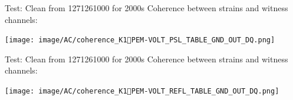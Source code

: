 \documentclass[xcolor=dvipsnames]{beamer}
\begin{document}
\begin{frame}[t]{Test: Clean from 1271261000 for 2000s}
  Coherence between strains and witness channels:
  \begin{center}
    \texttt{[image: image/AC/coherence\_K1PEM-VOLT\_PSL\_TABLE\_GND\_OUT\_DQ.png]}
  \end{center}
\end{frame}

\begin{frame}[t]{Test: Clean from 1271261000 for 2000s}
  Coherence between strains and witness channels:
  \begin{center}
    \texttt{[image: image/AC/coherence\_K1PEM-VOLT\_REFL\_TABLE\_GND\_OUT\_DQ.png]}
  \end{center}
\end{frame}
\fi
\end{document}
